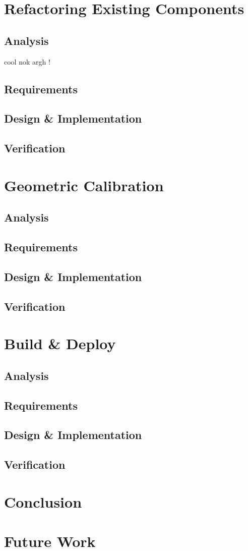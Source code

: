 \documentclass[10pt,a4paper]{memoir}
\begin{document}
\section{Refactoring Existing Components}
\subsection{Analysis}
cool nok
argh !
\subsection{Requirements}
\subsection{Design \& Implementation}
\subsection{Verification}

\section{Geometric Calibration}
\subsection{Analysis}
\subsection{Requirements}
\subsection{Design \& Implementation}
\subsection{Verification}

\section{Build \& Deploy}
\subsection{Analysis}
\subsection{Requirements}
\subsection{Design \& Implementation}
\subsection{Verification}


\section{Conclusion}
\section{Future Work}
\listoftodos
\end{document}
